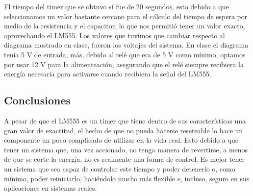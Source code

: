 El tiempo del timer que se obtuvo sí fue de 20 segundos, esto debido a que seleccionamos un valor bastante cercano para el cálculo del tiempo de espera por medio de la resistencia y el capacitor, lo que nos permitió tener un valor exacto, aprovechando el LM555. Los valores que tuvimos que cambiar respecto al diagrama mostrado en clase, fueron los voltajes del sistema. En clase el diagrama tenía 5 V de entrada, más, debido al relé que era de 5 V como mínimo, optamos por usar 12 V para la alimenteación, asegurando que el relé siempre recibiera la energía necesaria para activarse cuando recibiera la señal del LM555.

\subsection{Conclusiones}

A pesar de que el LM555 es un timer que tiene dentro de sus características una gran valor de exactitud, el hecho de que no pueda hacerse reseteable lo hace un componente un poco complicado de utilizar en la vida real. Esto debido a que tener un sistema que, una vez accionado, no tenga manera de revertirse, a menos de que se corte la energía, no es realmente una forma de control. Es mejor tener un sistema que sea capaz de controlar este tiempo y poder detenerlo o, como mínimo, poder reiniciarlo, haciéndolo mucho más flexible e, incluso, seguro en sus aplicaciones en sistemas reales.

